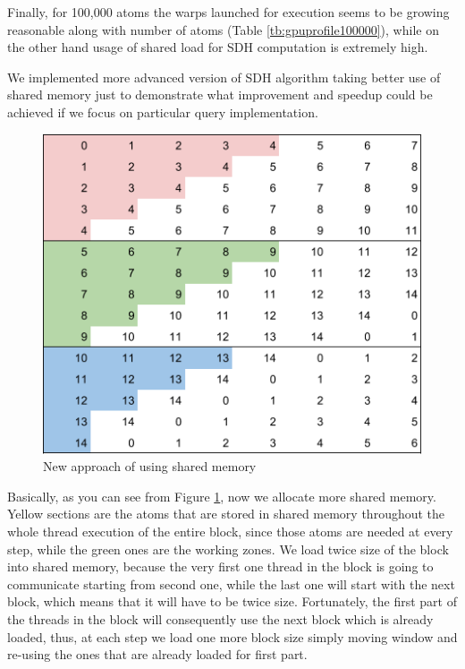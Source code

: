 \documentclass[12pt,letterpaper]{report}
\begin{document}
\noindent\hspace{3em}Finally, for 100,000 atoms the warps launched for execution seems to be growing reasonable along with number of atoms (Table \ref{tb:gpuprofile100000}), while on the other hand usage of shared load for SDH computation is extremely high.

\noindent\hspace{3em} We implemented more advanced version of SDH algorithm taking better use of shared memory just to demonstrate what improvement and speedup could be achieved if we focus on particular query implementation.

\begin{figure}
 \centerline{ \includegraphics[width=0.3\columnwidth]{images/sharedMem}}
 \caption{New approach of using shared memory}
 \label{fg:improved_sdh}
\end{figure}

\noindent\hspace{3em}Basically, as you can see from Figure \ref{fg:improved_sdh}, now we allocate more shared memory. Yellow sections are the atoms that are stored in shared memory throughout the whole thread execution of the entire block, since those atoms are needed at every step, while the green ones are the working zones. We load twice size of the block into shared memory, because the very first one thread in the block is going to communicate starting from second one, while the last one will start with the next block, which means that it will have to be twice size. Fortunately, the first part of the threads in the block will consequently use the next block which is already loaded, thus, at each step we load one more block size simply moving window and re-using the ones that are already loaded for first part.
\end{document}
